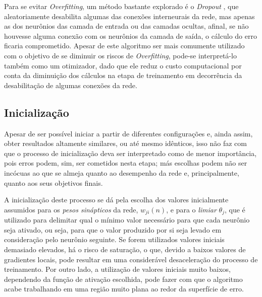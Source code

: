 
Para se evitar \textit{Overfitting}, um método bastante explorado é o \textit{Dropout} \citep{srivastava2014dropout}, que aleatoriamente desabilita algumas das conexões interneurais da rede, mas apenas as dos neurônios das camada de entrada ou das camadas ocultas, afinal, se não houvesse alguma conexão com os neurônios da camada de saída, o cálculo do erro ficaria comprometido. Apesar de este algoritmo ser mais comumente utilizado com o objetivo de se diminuir os riscos de \textit{Overfitting}, pode-se interpretá-lo também como um otimizador, dado que ele reduz o custo computacional por conta da diminuição dos cálculos na etapa de treinamento em decorrência da desabilitação de algumas conexões da rede.







\subsection{Inicialização}
\label{subsec:ann_initialization}

Apesar de ser possível iniciar a partir de diferentes configurações e, ainda assim, obter resultados altamente similares, ou até mesmo idênticos, isso não faz com que o processo de inicialização deva ser interpretado como de menor importância, pois erros podem, sim, ser cometidos nesta etapa; más escolhas podem não ser incócuas ao que se almeja quanto ao desempenho da rede e, principalmente, quanto aos seus objetivos finais.

A inicialização deste processo se dá pela escolha dos valores inicialmente assumidos para os \textit{pesos sinápticos} da rede, $w_{ji}(n)$, e para o \textit{limiar} $\theta_{j}$, que é utilizado para delimitar qual o mínimo valor necessário para que cada neurônio seja ativado, ou seja, para que o valor produzido por si seja levado em consideração pelo neurônio seguinte. Se forem utilizados valores iniciais demasiado elevados, há o risco de saturação, o que, devido a baixos valores de gradientes locais, pode resultar em uma considerável desaceleração do processo de treinamento. Por outro lado, a utilização de valores iniciais muito baixos, dependendo da função de ativação escolhida, pode fazer com que o algoritmo acabe trabalhando em uma região muito plana ao redor da superfície de erro.

